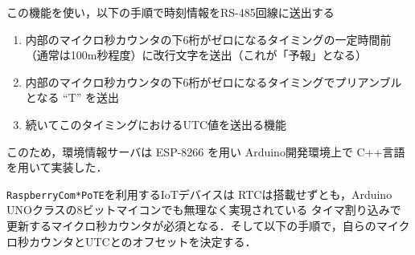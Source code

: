 {この機能を使い，以下の手順で時刻情報をRS-485回線に送出する

\begin{enumerate}
\item 内部のマイクロ秒カウンタの下6桁がゼロになるタイミングの一定時間前（通常は100m秒程度）に改行文字を送出（これが「予報」となる）
\item 内部のマイクロ秒カウンタの下6桁がゼロになるタイミングでプリアンブルとなる ``T'' を送出
\item 続いてこのタイミングにおけるUTC値を送出る機能
\end{enumerate}

このため，環境情報サーバは ESP-8266 を用い Arduino開発環境上で C++言語を用いて実装した．\\



 \par


{\tt Raspberry\-Com*PoTE}を利用するIoTデバイスは RTCは搭載せずとも，Arduino UNOクラスの8ビットマイコンでも無理なく実現されている タイマ割り込みで更新するマイクロ秒カウンタが必須となる．そして以下の手順で，自らのマイクロ秒カウンタとUTCとのオフセットを決定する．

}
